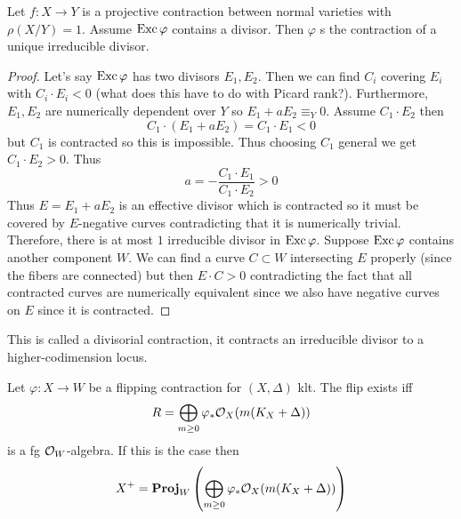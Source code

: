 \documentclass[12pt]{article}
\begin{document}
\begin{lemma}
Let $f : X \to Y$ is a projective contraction between normal varieties with $\rho(X/Y) = 1$. Assume $\operatorname{\mathrm{Exc}}{\varphi}$ contains a divisor. Then $\varphi$ s the contraction of a unique irreducible divisor.
\end{lemma}

\begin{proof}
Let's say $\operatorname{\mathrm{Exc}}{\varphi}$ has two divisors $E_1, E_2$. Then we can find $C_i$ covering $E_i$ with $C_i \cdot E_i < 0$ (what does this have to do with Picard rank?). Furthermore, $E_1, E_2$ are numerically dependent over $Y$ so $E_1 + a E_2 \equiv_Y 0$. Assume $C_1 \cdot E_2$ then
\[ C_1 \cdot (E_1 + a E_2) = C_1 \cdot E_1 < 0 \]
but $C_1$ is contracted so this is impossible. Thus choosing $C_1$ general we get $C_1 \cdot E_2 > 0$. Thus
\[ a = - \frac{C_1 \cdot E_1}{C_1 \cdot E_2} > 0 \]
Thus $E = E_1 + a E_2$ is an effective divisor which is contracted so it must be covered by $E$-negative curves contradicting that it is numerically trivial. Therefore, there is at most $1$ irreducible divisor in $\operatorname{\mathrm{Exc}}{\varphi}$. Suppose $\operatorname{\mathrm{Exc}}{\varphi}$ contains another component $W$. We can find a curve $C \subset W$ intersecting $E$ properly (since the fibers are connected) but then $E \cdot C > 0$ contradicting the fact that all contracted curves are numerically equivalent since we also have negative curves on $E$ since it is contracted.  
\end{proof}

This is called a divisorial contraction, it contracts an irreducible divisor to a higher-codimension locus.

\begin{prop}
Let $\varphi : X \to W$ be a flipping contraction for $(X, \Delta)$ klt. The flip exists iff
\[ R = \bigoplus_{m \ge 0} \varphi_* \mathcal{O}_{X}(m(K_X + \Delta)) \]
is a fg $\mathcal{O}_{W}$-algebra. If this is the case then 
\[ X^+ = \mathbf{Proj}_{W}\left( \bigoplus_{m \ge 0} \varphi_* \mathcal{O}_{X}(m(K_X + \Delta))  \right)\]
\end{prop}
\end{document}
